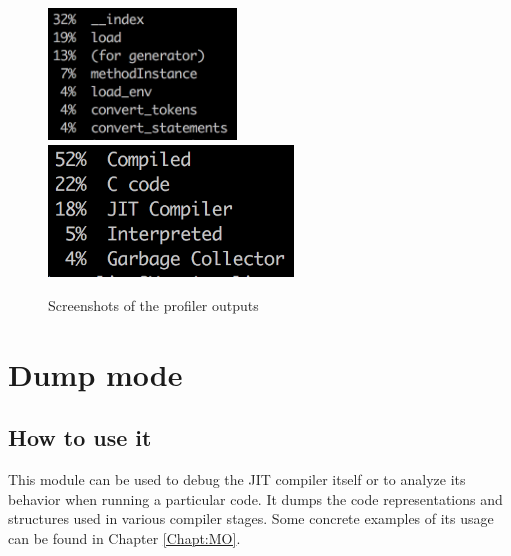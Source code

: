 \begin{figure}[H]
    \centering
    \includegraphics[height=3.5cm]{luajit/images/chapter4/profiler-1.png}
    \includegraphics[height=3.5cm]{luajit/images/chapter4/profiler-2.png}
    \caption{Screenshots of the profiler outputs}
    \label{fig:profiler}
\end{figure}


\section{Dump mode}
\label{Sec:Dump-mode}




\subsection{How to use it}
\label{Subsec:dump-usage}

This module can be used to debug the JIT compiler itself or to analyze its
behavior when running a particular code. It dumps the
code representations and structures used in various compiler stages. Some
concrete examples of its usage can be found in Chapter \ref{Chapt:MO}.

